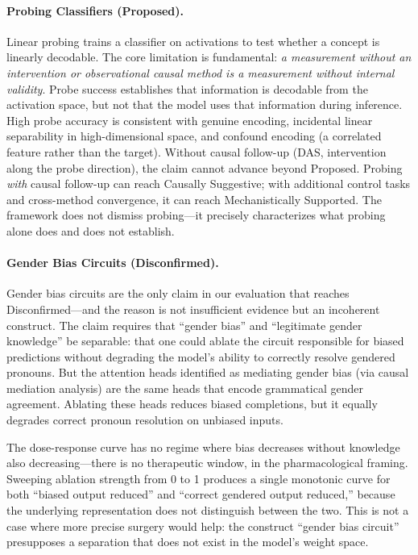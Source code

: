 \documentclass{article}
\begin{document}
\paragraph{Probing Classifiers (Proposed).} Linear probing \citep{belinkov2022probing} trains a classifier on activations to test whether a concept is linearly decodable. The core limitation is fundamental: \emph{a measurement without an intervention or observational causal method is a measurement without internal validity}. Probe success establishes that information is decodable from the activation space, but not that the model uses that information during inference. High probe accuracy is consistent with genuine encoding, incidental linear separability in high-dimensional space, and confound encoding (a correlated feature rather than the target). Without causal follow-up (DAS, intervention along the probe direction), the claim cannot advance beyond Proposed. Probing \emph{with} causal follow-up can reach Causally Suggestive; with additional control tasks and cross-method convergence, it can reach Mechanistically Supported. The framework does not dismiss probing---it precisely characterizes what probing alone does and does not establish.

\paragraph{Gender Bias Circuits (Disconfirmed).} Gender bias circuits \citep{vig2020gender} are the only claim in our evaluation that reaches Disconfirmed---and the reason is not insufficient evidence but an incoherent construct. The claim requires that ``gender bias'' and ``legitimate gender knowledge'' be separable: that one could ablate the circuit responsible for biased predictions without degrading the model's ability to correctly resolve gendered pronouns. But the attention heads identified as mediating gender bias (via causal mediation analysis) are the same heads that encode grammatical gender agreement. Ablating these heads reduces biased completions, but it equally degrades correct pronoun resolution on unbiased inputs.

The dose-response curve has no regime where bias decreases without knowledge also decreasing---there is no therapeutic window, in the pharmacological framing. Sweeping ablation strength from 0 to 1 produces a single monotonic curve for both ``biased output reduced'' and ``correct gendered output reduced,'' because the underlying representation does not distinguish between the two. This is not a case where more precise surgery would help: the construct ``gender bias circuit'' presupposes a separation that does not exist in the model's weight space.
\end{document}

